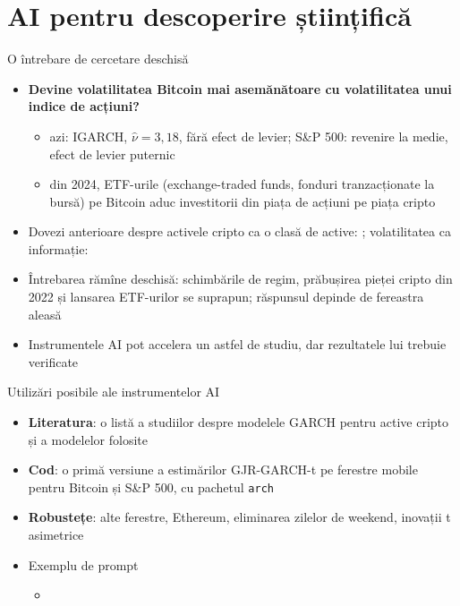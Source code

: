 \section{AI pentru descoperire științifică}

\begin{frame}{O întrebare de cercetare deschisă}
\itemsize{\small}
\begin{itemize}
    \item \textbf{Devine volatilitatea Bitcoin mai asemănătoare cu volatilitatea unui indice de acțiuni?}
    \begin{itemize}
        \item azi: IGARCH, $\hat\nu = 3{,}18$, fără efect de levier; S\&P 500: revenire la medie, efect de levier puternic
        \item din 2024, ETF-urile (exchange-traded funds, fonduri tranzacționate la bursă) pe Bitcoin aduc investitorii din piața de acțiuni pe piața cripto
    \end{itemize}
    \item Dovezi anterioare despre activele cripto ca o clasă de active: ; volatilitatea ca informație: 
    \item Întrebarea rămîne deschisă: schimbările de regim, prăbușirea pieței cripto din 2022 și lansarea ETF-urilor se suprapun; răspunsul depinde de fereastra aleasă
    \item Instrumentele AI pot accelera un astfel de studiu, dar rezultatele lui trebuie verificate 
\end{itemize}
\end{frame}

\begin{frame}{Utilizări posibile ale instrumentelor AI}
\itemsize{\small}
\begin{itemize}
    \item \textbf{Literatura}: o listă a studiilor despre modelele GARCH pentru active cripto și a modelelor folosite
    \item \textbf{Cod}: o primă versiune a estimărilor GJR-GARCH-t pe ferestre mobile pentru Bitcoin și S\&P 500, cu pachetul \texttt{arch}
    \item \textbf{Robustețe}: alte ferestre, Ethereum, eliminarea zilelor de weekend, inovații t asimetrice
    \item Exemplu de prompt
    \begin{itemize}
        \item {}
    \end{itemize}
\end{itemize}
\end{frame}

